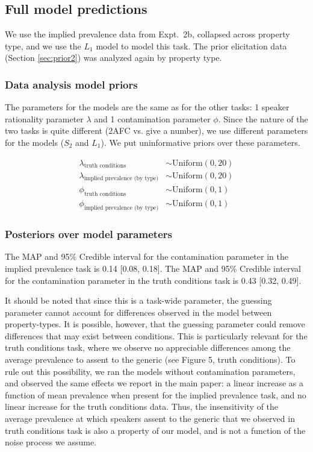 \documentclass[10pt,letterpaper]{article}
\begin{document}
\subsection{Full model predictions}


We use the implied prevalence data from Expt.~2b, collapsed across property type, and we use the $L_1$ model to model this task. 
The prior elicitation data (Section \ref{sec:prior2}) was analyzed again by property type.


\subsubsection{Data analysis model priors}

The parameters for the models are the same as for the other tasks: 1 speaker rationality parameter $\lambda$ and 1 contamination parameter $\phi$. 
Since the nature of the two tasks is quite different (2AFC vs. give a number), we use different parameters for the models ($S_2$ and $L_1$).
We put uninformative priors over these parameters.

\begin{align*}
\lambda_{\text{truth conditions}} & \sim \text{Uniform}(0, 20) \\
\lambda_{\text{implied prevalence (by type)}} & \sim \text{Uniform}(0, 20) \\
\phi_{\text{truth conditions}} & \sim \text{Uniform}(0,1) \\ 
\phi_{\text{implied prevalence (by type)}} & \sim \text{Uniform}(0,1)
\end{align*}



\subsubsection{Posteriors over model parameters}

The MAP and 95\% Credible interval for the contamination parameter in the implied prevalence task is 0.14 [0.08, 0.18]. 
The MAP and 95\% Credible interval for the contamination parameter in the truth conditions task is 0.43 [0.32, 0.49]. 

It should be noted that since this is a task-wide parameter, the guessing parameter cannot account for differences observed in the model between property-types.
It is possible, however, that the guessing parameter could remove differences that may exist between conditions. 
This is particularly relevant for the truth conditions task, where we observe no appreciable differences among the average prevalence to assent to the generic (see Figure 5, truth conditions). 
To rule out this possibility, we ran the models without contamination parameters, and observed the same effects we report in the main paper: a linear increase as a function of mean prevalence when present for the implied prevalence task, and no linear increase for the truth conditions data. 
Thus, the insensitivity of the average prevalence at which speakers assent to the generic that we observed in truth conditions task is also a property of our model, and is not a function of the noise process we assume.
\end{document}
